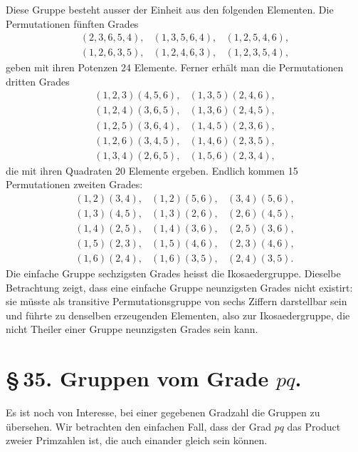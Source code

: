 \documentclass[11pt]{article}
\begin{document}
Diese Gruppe besteht ausser der Einheit aus den folgenden Elementen. Die Permutationen fünften Grades
\[
\begin{array}{lll}
(2,3,6,5,4),&(1,3,5,6,4),&(1,2,5,4,6),\\
(1,2,6,3,5),&(1,2,4,6,3),&(1,2,3,5,4),
\end{array}
\]
geben mit ihren Potenzen 24 Elemente. Ferner erhält man die Permutationen dritten Grades
\[
\begin{array}{ll}
(1,2,3)(4,5,6),&(1,3,5)(2,4,6),\\
(1,2,4)(3,6,5),&(1,3,6)(2,4,5),\\
(1,2,5)(3,6,4),&(1,4,5)(2,3,6),\\
(1,2,6)(3,4,5),&(1,4,6)(2,3,5),\\
(1,3,4)(2,6,5),&(1,5,6)(2,3,4),
\end{array}
\]
die mit ihren Quadraten 20 Elemente ergeben. Endlich kommen 15 Permutationen zweiten Grades:
\[
\begin{array}{lll}
(1,2)(3,4),&(1,2)(5,6),&(3,4)(5,6),\\
(1,3)(4,5),&(1,3)(2,6),&(2,6)(4,5),\\
(1,4)(2,5),&(1,4)(3,6),&(2,5)(3,6),\\
(1,5)(2,3),&(1,5)(4,6),&(2,3)(4,6),\\
(1,6)(2,4),&(1,6)(3,5),&(2,4)(3,5).
\end{array}
\]
Die einfache Gruppe sechzigsten Grades heisst die Ikosaedergruppe. Dieselbe Betrachtung zeigt, dass eine einfache Gruppe neunzigsten Grades nicht existirt: sie müsste als transitive Permutationsgruppe von sechs Ziffern darstellbar sein und führte zu denselben erzeugenden Elementen, also zur Ikosaedergruppe, die nicht Theiler einer Gruppe neunzigsten Grades sein kann.

\section*{\S\,35. Gruppen vom Grade $pq$.}

Es ist noch von Interesse, bei einer gegebenen Gradzahl die Gruppen zu übersehen. Wir betrachten den einfachen Fall, dass der Grad $pq$ das Product zweier Primzahlen ist, die auch einander gleich sein können.
\end{document}
